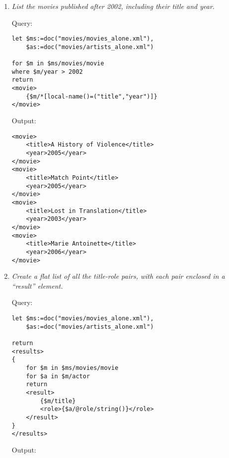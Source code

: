 \documentclass[a4paper, notitlepage]{article}
\begin{document}
\begin{enumerate}
\item  
  \emph{List the movies published after 2002, including their title and year.} 
  
Query: 
  
\begin{lstlisting}
let $ms:=doc("movies/movies_alone.xml"),
    $as:=doc("movies/artists_alone.xml")

for $m in $ms/movies/movie
where $m/year > 2002
return
<movie>
	{$m/*[local-name()=("title","year")]}
</movie>
\end{lstlisting}
  
Output:
  
\begin{lstlisting}
<movie>
	<title>A History of Violence</title>
	<year>2005</year>
</movie>
<movie>
	<title>Match Point</title>
	<year>2005</year>
</movie>
<movie>
	<title>Lost in Translation</title>
	<year>2003</year>
</movie>
<movie>
	<title>Marie Antoinette</title>
	<year>2006</year>
</movie>
\end{lstlisting} 

\item  
  \emph{Create a flat list of all the title-role pairs, with each pair enclosed in a ``result'' element.} 
  
Query: 
  
\begin{lstlisting}
let $ms:=doc("movies/movies_alone.xml"),
    $as:=doc("movies/artists_alone.xml")

return
<results>
{     
    for $m in $ms/movies/movie
    for $a in $m/actor
    return
    <result>
        {$m/title}
        <role>{$a/@role/string()}</role>
    </result>    
}
</results>
\end{lstlisting}
  
Output:
  

\end{enumerate}
\end{document}
